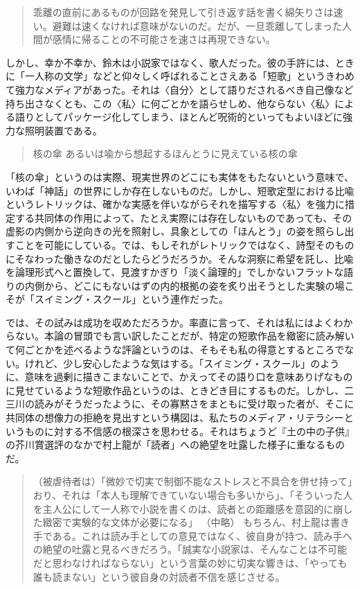 \documentclass[uplatex,a4paper,oneside,landscape]{jsarticle}
\begin{document}
\begin{quote}
乖離の直前にあるものが回路を発⾒して引き返す話を書く綿⽮りさは速い。避難は速くなければ意味がないのだ。だが、⼀旦乖離してしまった⼈間が感情に帰ることの不可能さを速さは再現できない。
\end{quote}

しかし、幸か不幸か、鈴⽊は⼩説家ではなく、歌⼈だった。彼の⼿許には、ときに「⼀⼈称の⽂学」などと仰々しく呼ばれることさえある「短歌」というきわめて強⼒なメディアがあった。それは〈自分〉として語りだされるべき⾃⼰像など持ち出さなくとも、この〈私〉に何ごとかを語らせしめ、他ならない〈私〉による語りとしてパッケージ化してしまう、ほとんど呪術的といってもよいほどに強⼒な照明装置である。

\begin{quote}
核の傘 あるいは喩から想起するほんとうに⾒えている核の傘
\end{quote}

「核の傘」というのは実際、現実世界のどこにも実体をもたないという意味で、いわば「神話」の世界にしか存在しないものだ。しかし、短歌定型における⽐喩というレトリックは、確かな実感を伴いながらそれを描写する〈私〉を強⼒に措定する共同体の作⽤によって、たとえ実際には存在しないものであっても、その虚影の内側から逆向きの光を照射し、具象としての「ほんとう」の姿を照らし出すことを可能にしている。では、もしそれがレトリックではなく、詩型そのものにそなわった働きなのだとしたらどうだろうか。そんな洞察に希望を託し、⽐喩を論理形式へと置換して、⾒渡すかぎり「淡く論理的」でしかないフラットな語りの内側から、どこにもないはずの内的根拠の姿を炙り出そうとした実験の場こそが「スイミング・スクール」という連作だった。

では、その試みは成功を収めただろうか。率直に⾔って、それは私にはよくわからない。本論の冒頭でも⾔い訳したことだが、特定の短歌作品を緻密に読み解いて何ごとかを述べるような評論というのは、そもそも私の得意とするところでない。けれど、少し安⼼したような気はする。「スイミング・スクール」のように、意味を過剰に描きこまないことで、かえってその語り⼝を意味ありげなものに⾒せているような短歌作品というのは、ときどき⽬にするものだ。しかし、⼆三川の読みがそうだったように、その寡黙さをまともに受け取った者が、そこに共同体の想像⼒の拒絶を⾒出すという構図は、私たちのメディア・リテラシーというものに対する不信感の根深さを思わせる。それはちょうど『⼟の中の⼦供』の芥川賞選評のなかで村上⿓が「読者」への絶望を吐露した様⼦に重なるものだ。

\begin{quote}
（被虐待者は）「微妙で切実で制御不能なストレスと不具合を併せ持って」おり、それは「本⼈も理解できていない場合も多いから」、「そういった⼈を主⼈公にして⼀⼈称で⼩説を書くのは、読者との距離感を意図的に崩した緻密で実験的な⽂体が必要になる」
（中略）
もちろん、村上⿓は書き⼿である。これは読み⼿としての意⾒ではなく、彼⾃⾝が持つ、読み⼿への絶望の吐露と⾒るべきだろう。「誠実な⼩説家は、そんなことは不可能だと思わなければならない」という⾔葉の妙に切実な響きは、「やっても誰も読まない」という彼⾃⾝の対読者不信を感じさせる。
\end{quote}
\end{document}
